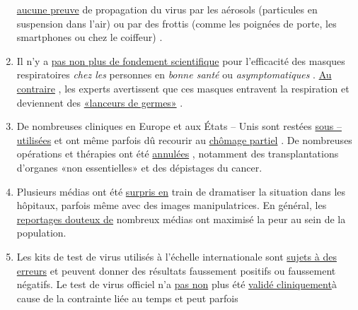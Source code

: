\begin{enumerate}
  \href{https://www.telegraph.co.uk/news/2020/04/02/no-proof-coronavirus-can-spread-shopping-says-leading-german/}{aucune
  preuve} de propagation du virus par les aérosols (particules en
  suspension dans l'air) ou par des frottis (comme les poignées de
  porte, les smartphones ou chez le coiffeur) .
\item
  Il n'y a
  \href{https://www.researchgate.net/publication/340570735_Masks_Don't_Work_A_review_of_science_relevant_to_COVID-19_social_policy}{pas
  non plus de fondement scientifique} pour l'efficacité des masques
  respiratoires \emph{chez les} personnes en \emph{bonne santé} ou
  \emph{asymptomatiques} .
  \href{https://www.aerztezeitung.de/Politik/Montgomery-haelt-Maskenpflicht-fuer-falsch-408844.html}{Au
  contraire} , les experts avertissent que ces masques entravent la
  respiration et deviennent des
  \href{https://de.sputniknews.com/interviews/20200425326953541-corona-gefahr-virologe/}{«lanceurs
  de germes»} .
\item
  De nombreuses cliniques en Europe et aux États -- Unis sont restées
  \href{https://www.hsj.co.uk/acute-care/nhs-hospitals-have-four-times-more-empty-beds-than-normal/7027392.article}{sous
  -- utilisées} et ont même parfois dû recourir au
  \href{https://www.usatoday.com/story/news/health/2020/04/02/coronavirus-pandemic-jobs-us-health-care-workers-furloughed-laid-off/5102320002/}{chômage
  partiel} . De nombreuses opérations et thérapies ont été
  \href{https://www.sfchronicle.com/bayarea/article/Stanford-hospital-system-to-cut-pay-20-furlough-15227591.php}{annulées}
  , notamment des transplantations d'organes «non essentielles» et des
  dépistages du cancer.
\item
  Plusieurs médias ont été
  \href{https://nypost.com/2020/04/01/cbs-admits-to-using-footage-from-italy-in-report-about-nyc/}{surpris
  en} train de dramatiser la situation dans les hôpitaux, parfois même
  avec des images manipulatrices. En général, les
  \href{https://onlinelibrary.wiley.com/doi/full/10.1111/eci.13222}{reportages
  douteux de} nombreux médias ont maximisé la peur au sein de la
  population.
\item
  Les kits de test de virus utilisés à l'échelle internationale sont
  \href{https://www.ncbi.nlm.nih.gov/pubmed/32219885}{sujets à des
  erreurs} et peuvent donner des résultats faussement positifs ou
  faussement négatifs. Le test de virus officiel n'a
  \href{https://www.youtube.com/watch?v=p_AyuhbnPOI}{pas non} plus été
  \href{https://www.youtube.com/watch?v=p_AyuhbnPOI}{validé
  cliniquement}à cause de la contrainte liée au temps et peut parfois

\end{enumerate}
